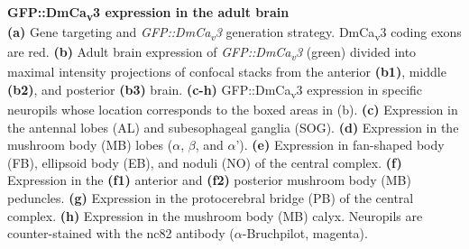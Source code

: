 \label{fig:2} 
\textbf{GFP::DmCa\textsubscript{v}3 expression in the adult brain} 
\\ 
\textbf{(a)} Gene targeting and \emph{GFP::DmCa\textsubscript{v}3} generation strategy. 
DmCa\textsubscript{v}3 coding exons are red.
\textbf{(b)} Adult brain expression of \emph{GFP::DmCa\textsubscript{v}3} (green) divided into maximal intensity projections of confocal stacks from the anterior \textbf{(b1)}, middle \textbf{(b2)}, and posterior \textbf{(b3)} brain.
\textbf{(c-h)} GFP::DmCa\textsubscript{v}3 expression in specific neuropils whose location corresponds to the boxed areas in (b).
\textbf{(c)} Expression in the antennal lobes (AL) and subesophageal ganglia (SOG).
\textbf{(d)} Expression in the mushroom body (MB) lobes ($\alpha$, $\beta$, and $\alpha$'). 
\textbf{(e)} Expression in fan-shaped body (FB), ellipsoid body (EB), and noduli (NO) of the central complex.
\textbf{(f)} Expression in the \textbf{(f1)} anterior and \textbf{(f2)} posterior mushroom body (MB) peduncles.
\textbf{(g)} Expression in the protocerebral bridge (PB) of the central complex. 
\textbf{(h)} Expression in the mushroom body (MB) calyx. 
Neuropils are counter-stained with the nc82 antibody ($\alpha$-Bruchpilot, magenta).

  